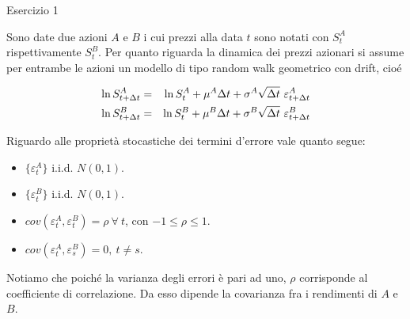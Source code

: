 \documentclass[a4paper,12pt]{article}
\begin{document}
{\Large Esercizio 1}

\bigskip

Sono date due azioni $A$ e $B$ i cui prezzi alla data $t$ sono notati con $%
S_{t}^{A}$ rispettivamente $S_{t}^{B}$. Per quanto riguarda la dinamica dei
prezzi azionari si assume per entrambe le azioni un modello di tipo random
walk geometrico con drift, cio\'{e}

\begin{eqnarray}
\ln S_{t+\Delta t}^{A} &=&\ln S_{t}^{A}+\mu ^{A}\Delta t+\sigma ^{A}\sqrt{%
\Delta t}\ \varepsilon _{t+\Delta t}^{A}  \label{eq1} \\
\ln S_{t+\Delta t}^{B} &=&\ln S_{t}^{B}+\mu ^{B}\Delta t+\sigma ^{B}\sqrt{%
\Delta t}\ \varepsilon _{t+\Delta t}^{B}  \label{eq2}
\end{eqnarray}

Riguardo alle propriet\`a stocastiche dei termini d'errore vale quanto segue:

\begin{itemize}
\item $\{\varepsilon_{t}^A\}$ i.i.d. $N(0,1)$.

\item $\{\varepsilon_{t}^B\}$ i.i.d. $N(0,1)$.

\item $cov(\varepsilon_{t}^A,\varepsilon_{t}^B)=\rho \ \forall \ t$, con $%
-1\leq \rho \leq 1$.

\item $cov(\varepsilon_{t}^A,\varepsilon_{s}^B)=0, \ t \neq s$.
\end{itemize}

Notiamo che poich\'{e} la varianza degli errori \`{e} pari ad uno, $\rho $
corrisponde al coefficiente di correlazione. Da esso dipende la covarianza
fra i rendimenti di $A$ e $B$.
\end{document}

